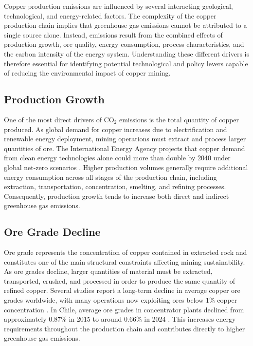 Copper production emissions are influenced by several interacting geological, technological, and energy-related factors. The complexity of the copper production chain implies that greenhouse gas emissions cannot be attributed to a single source alone. Instead, emissions result from the combined effects of production growth, ore quality, energy consumption, process characteristics, and the carbon intensity of the energy system. Understanding these different drivers is therefore essential for identifying potential technological and policy levers capable of reducing the environmental impact of copper mining.


\subsection{Production Growth}

One of the most direct drivers of CO$_2$ emissions is the total quantity of copper produced. As global demand for copper increases due to electrification and renewable energy deployment, mining operations must extract and process larger quantities of ore. The International Energy Agency projects that copper demand from clean energy technologies alone could more than double by 2040 under global net-zero scenarios \cite{IEA2021}. Higher production volumes generally require additional energy consumption across all stages of the production chain, including extraction, transportation, concentration, smelting, and refining processes. Consequently, production growth tends to increase both direct and indirect greenhouse gas emissions.

\subsection{Ore Grade Decline}

Ore grade represents the concentration of copper contained in extracted rock and constitutes one of the main structural constraints affecting mining sustainability. As ore grades decline, larger quantities of material must be extracted, transported, crushed, and processed in order to produce the same quantity of refined copper. Several studies report a long-term decline in average copper ore grades worldwide, with many operations now exploiting ores below 1\% copper concentration \cite{Northey2014,Calvo2016}. In Chile, average ore grades in concentrator plants declined from approximately 0.87\% in 2015 to around 0.66\% in 2024 \cite{Cochilco2024}. This increases energy requirements throughout the production chain and contributes directly to higher greenhouse gas emissions.

